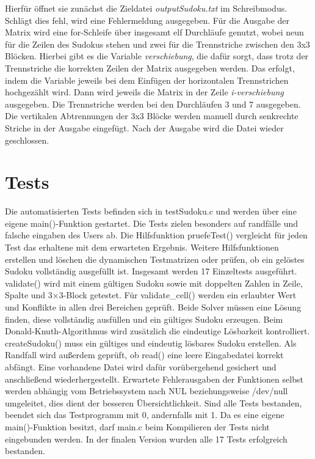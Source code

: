 \documentclass[a4paper,10pt]{article}
\begin{document}
Hierfür öffnet sie zunächst die Zieldatei \textit{outputSudoku.txt} im Schreibmodus. Schlägt dies fehl, wird eine Fehlermeldung ausgegeben. Für die Ausgabe der Matrix wird eine for-Schleife über insgesamt elf Durchläufe genutzt, wobei neun für die Zeilen des Sudokus stehen und zwei für die Trennstriche zwischen den 3x3 Blöcken. Hierbei gibt es die Variable \textit{verschiebung}, die dafür sorgt, dass trotz der Trennstriche die korrekten Zeilen der Matrix ausgegeben werden. Das erfolgt, indem die Variable jeweils bei dem Einfügen der horizontalen Trennstrichen hochgezählt wird. Dann wird jeweils die Matrix in der Zeile \textit{i-verschiebung} ausgegeben. Die Trennstriche werden bei den Durchläufen 3 und 7 ausgegeben. Die vertikalen Abtrennungen der 3x3 Blöcke werden manuell durch senkrechte Striche in der Ausgabe eingefügt. Nach der Ausgabe wird die Datei wieder geschlossen.


\section{Tests}
Die automatisierten Tests befinden sich in testSudoku.c und werden über eine eigene main()-Funktion gestartet. Die Tests zielen besonders auf randfälle und falsche eingaben des Users ab. Die Hilfsfunktion pruefeTest() vergleicht für jeden Test das erhaltene mit dem erwarteten Ergebnis. Weitere Hilfsfunktionen erstellen und löschen die dynamischen Testmatrizen oder prüfen, ob ein gelöstes Sudoku vollständig ausgefüllt ist.
Insgesamt werden 17 Einzeltests ausgeführt. validate() wird mit einem gültigen Sudoku sowie mit doppelten Zahlen in Zeile, Spalte und 3×3-Block getestet. Für validate\_cell() werden ein erlaubter Wert und Konflikte in allen drei Bereichen geprüft. Beide Solver müssen eine Lösung finden, diese vollständig ausfüllen und ein gültiges Sudoku erzeugen. Beim Donald-Knuth-Algorithmus wird zusätzlich die eindeutige Lösbarkeit kontrolliert. createSudoku() muss ein gültiges und eindeutig lösbares Sudoku erstellen. Als Randfall wird außerdem geprüft, ob read() eine leere Eingabedatei korrekt abfängt. Eine vorhandene Datei wird dafür vorübergehend gesichert und anschließend wiederhergestellt.
Erwartete Fehlerausgaben der Funktionen selbst werden abhängig vom Betriebssystem nach NUL beziehungsweise /dev/null umgeleitet, dies dient der besseren Übersichtlichkeit. Sind alle Tests bestanden, beendet sich das Testprogramm mit 0, andernfalls mit 1. Da es eine eigene main()-Funktion besitzt, darf main.c beim Kompilieren der Tests nicht eingebunden werden. In der finalen Version wurden alle 17 Tests erfolgreich bestanden.
\end{document}
